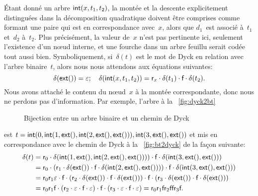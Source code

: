 Étant donné un arbre \(\textsf{int}(x,t_1,t_2)\), la montée et la
descente explicitement distinguées dans la décomposition quadratique
doivent être comprises comme formant une paire qui est en
correspondance avec~\(x\), alors que \(d_1\)~est associé à~\(t_1\)
et~\(d_2\) à~\(t_2\). Plus précisément, la valeur de~\(x\) n'est pas
pertinente ici, seulement l'existence d'un n{\oe}ud interne, et une
fourche dans un arbre feuillu serait codée tout aussi
bien. Symboliquement, si~\(\delta(t)\) est le mot de Dyck en relation
avec l'arbre binaire~\(t\), alors nous nous attendons aux équations
suivantes:
\begin{equation}
\delta(\textsf{ext}()) = \varepsilon; \quad \delta(\textsf{int}(x,t_1,t_2))
= \textsf{r}_{x} \cdot \delta(t_1) \cdot \textsf{f} \cdot \delta(t_2).
\label{eq_delta}
\end{equation}
Nous avons attaché le contenu du n{\oe}ud~\(x\) à la montée
correspondante, donc nous ne perdons pas d'information. Par exemple,
l'arbre à la \fig~\vref{fig:dyck2bt}
\begin{figure}[b]
\centering
{}
\qquad\quad
\subfloat[Chemin de Dyck correspondant au codage préfixe $[0,1,\Box,2,\Box,\Box,3,\Box,\Box\char93$\label{fig:bt2dyck}]{%
\texttt{[image: bt2dyck]}}
\caption{Bijection entre un arbre binaire et un chemin de Dyck}
\end{figure}
est \(t=\textsf{int}(0, \textsf{int}(1, \textsf{ext}(), \textsf{int}(2,
\textsf{ext}(), \textsf{ext}())), \textsf{int}(3, \textsf{ext}(), \textsf{ext}())\)
et mis en correspondance avec le chemin de Dyck à la
\fig~\vref{fig:bt2dyck} de la
façon suivante:
\begin{align*}
\delta(t)
&= \textsf{r}_0 \cdot \delta(\textsf{int}(1, \textsf{ext}(),
\textsf{int}(2, \textsf{ext}(), \textsf{ext}()))) \cdot \textsf{f} \cdot
\delta(\textsf{int}(3, \textsf{ext}(), \textsf{ext}()))\\ &= \textsf{r}_0
\cdot (\textsf{r}_1 \cdot \delta(\textsf{ext}()) \cdot \textsf{f} \cdot
\delta(\textsf{int}(2, \textsf{ext}(), \textsf{ext}()))) \cdot
\textsf{f} \cdot \delta(\textsf{int}(3, \textsf{ext}(), \textsf{ext}()))\\
&= \textsf{r}_0 \textsf{r}_1 \varepsilon \cdot \textsf{f} \cdot (\textsf{r}_2
\cdot \delta(\textsf{ext}()) \cdot \textsf{f} \cdot \delta(\textsf{ext}()))
\cdot \textsf{f} \cdot (\textsf{r}_3 \cdot \delta(\textsf{ext}()) \cdot \textsf{f}
\cdot \delta(\textsf{ext}()))\\
&= \textsf{r}_0 \textsf{r}_1 \textsf{f} \cdot (\textsf{r}_2 \cdot
\varepsilon \cdot \textsf{f} \cdot \varepsilon) \cdot
\textsf{f} \cdot (\textsf{r}_3 \cdot \varepsilon \cdot \textsf{f} \cdot
\varepsilon)
= \textsf{r}_0\textsf{r}_1\textsf{f}\textsf{r}_2\textsf{f}\textsf{f}\textsf{r}_3\textsf{f}.
\end{align*}
